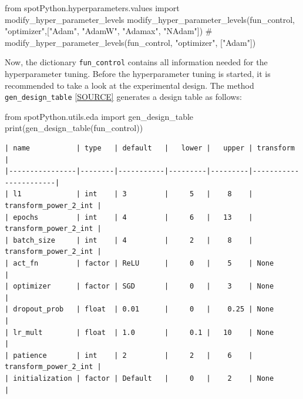 \documentclass[
  letterpaper,
  DIV=11,
  numbers=noendperiod]{scrreprt}
\newenvironment{Shaded}{\begin{snugshade}}{\end{snugshade}}
\newcommand{\BuiltInTok}[1]{\textcolor[rgb]{0.00,0.23,0.31}{#1}}
\newcommand{\CommentTok}[1]{\textcolor[rgb]{0.37,0.37,0.37}{#1}}
\newcommand{\ImportTok}[1]{\textcolor[rgb]{0.00,0.46,0.62}{#1}}
\newcommand{\NormalTok}[1]{\textcolor[rgb]{0.00,0.23,0.31}{#1}}
\newcommand{\StringTok}[1]{\textcolor[rgb]{0.13,0.47,0.30}{#1}}
\begin{document}
\begin{Shaded}
\begin{Highlighting}[]
\ImportTok{from}\NormalTok{ spotPython.hyperparameters.values }\ImportTok{import}\NormalTok{ modify\_hyper\_parameter\_levels}
\NormalTok{modify\_hyper\_parameter\_levels(fun\_control, }\StringTok{"optimizer"}\NormalTok{,[}\StringTok{"Adam"}\NormalTok{, }\StringTok{"AdamW"}\NormalTok{, }\StringTok{"Adamax"}\NormalTok{, }\StringTok{"NAdam"}\NormalTok{])}
\CommentTok{\# modify\_hyper\_parameter\_levels(fun\_control, "optimizer", ["Adam"])}
\end{Highlighting}
\end{Shaded}

Now, the dictionary \texttt{fun\_control} contains all information
needed for the hyperparameter tuning. Before the hyperparameter tuning
is started, it is recommended to take a look at the experimental design.
The method \texttt{gen\_design\_table}
\href{https://github.com/sequential-parameter-optimization/spotPython/blob/main/src/spotPython/utils/eda.py}{{[}SOURCE{]}}
generates a design table as follows:

\begin{Shaded}
\begin{Highlighting}[]
\ImportTok{from}\NormalTok{ spotPython.utils.eda }\ImportTok{import}\NormalTok{ gen\_design\_table}
\BuiltInTok{print}\NormalTok{(gen\_design\_table(fun\_control))}
\end{Highlighting}
\end{Shaded}

\begin{verbatim}
| name           | type   | default   |   lower |   upper | transform             |
|----------------|--------|-----------|---------|---------|-----------------------|
| l1             | int    | 3         |     5   |    8    | transform_power_2_int |
| epochs         | int    | 4         |     6   |   13    | transform_power_2_int |
| batch_size     | int    | 4         |     2   |    8    | transform_power_2_int |
| act_fn         | factor | ReLU      |     0   |    5    | None                  |
| optimizer      | factor | SGD       |     0   |    3    | None                  |
| dropout_prob   | float  | 0.01      |     0   |    0.25 | None                  |
| lr_mult        | float  | 1.0       |     0.1 |   10    | None                  |
| patience       | int    | 2         |     2   |    6    | transform_power_2_int |
| initialization | factor | Default   |     0   |    2    | None                  |
\end{verbatim}
\end{document}
